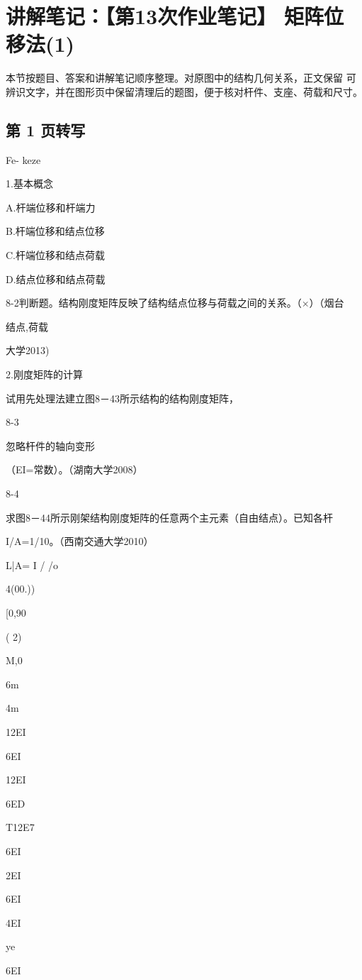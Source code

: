 \section{讲解笔记：【第13次作业笔记】 矩阵位移法(1)}
\begin{analysisbox}
本节按题目、答案和讲解笔记顺序整理。对原图中的结构几何关系，正文保留 可辨识文字，并在图形页中保留清理后的题图，便于核对杆件、支座、荷载和尺寸。
\end{analysisbox}
\subsection*{第 1 页转写}
Fe- keze

1.基本概念

A.杆端位移和杆端力

B.杆端位移和结点位移

C.杆端位移和结点荷载

D.结点位移和结点荷载

8-2判断题。结构刚度矩阵反映了结构结点位移与荷载之间的关系。（$\times$）（烟台

结点,荷载

大学2013)

2.刚度矩阵的计算

试用先处理法建立图8－43所示结构的结构刚度矩阵，

8-3

忽略杆件的轴向变形

（EI=常数）。（湖南大学2008）

8-4

求图8－44所示刚架结构刚度矩阵的任意两个主元素（自由结点）。已知各杆

I/A=1/10。（西南交通大学2010）

L|A= I / /o

4(00.))

[0,90

( 2)

M,0

6m

4m

12EI

6EI

12EI

6ED

T12E7

6EI

2EI

6EI

4EI

ye

6EI

